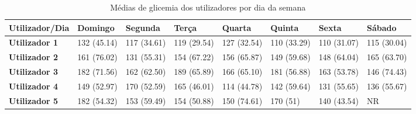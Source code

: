\begin{table}[H]
\centering
\begin{adjustbox}{max width=\textwidth}


\begin{tabular}{|l|l|l|l|l|l|l|l|}
\hline
\rowcolor[HTML]{C0C0C0} 
{\color[HTML]{000000} \textbf{Utilizador/Dia}} & {\color[HTML]{000000} \textbf{Domingo}} & {\color[HTML]{000000} \textbf{Segunda}} & {\color[HTML]{000000} \textbf{Terça}} & {\color[HTML]{000000} \textbf{Quarta}} & {\color[HTML]{000000} \textbf{Quinta}} & {\color[HTML]{000000} \textbf{Sexta}} & {\color[HTML]{000000} \textbf{Sábado}} \\ \hline
\rowcolor[HTML]{FFFFFF} 
\cellcolor[HTML]{C0C0C0}\textbf{Utilizador 1}  & 132 (45.14)                                  & 117 (34.61)                                     & 119 (29.54)                                   & 127 (32.54)                                    & 110 (33.29)                                    & 110 (31.07)                                   & 115 (30.04)                                    \\ \hline
\rowcolor[HTML]{FFFFFF} 
\cellcolor[HTML]{C0C0C0}\textbf{Utilizador 2}  & 161 (76.02)                                     & 131 (55.31)                                     & 154 (67.22)                                   & 156 (65.87)                                    & 149 (59.68)                                    & 148 (64.04)                                   & 165 (63.70)                                    \\ \hline
\rowcolor[HTML]{FFFFFF} 
\cellcolor[HTML]{C0C0C0}\textbf{Utilizador 3}  & 182 (71.56)                                     & 162 (62.50)                                      & 189 (65.89)                                   & 166 (65.10)                                    & 181 (56.88)                                     & 163 (53.78)                                   & 146 (74.43)                                    \\ \hline
\rowcolor[HTML]{FFFFFF} 
\cellcolor[HTML]{C0C0C0}\textbf{Utilizador 4}  & 149 (52.97)                                     & 170 (52.59)                                     & 165 (46.01)                                   & 114 (44.78)                                    & 142 (59.64)                                    & 131 (55.65)                                   & 136 (55.67)                                    \\ \hline
\rowcolor[HTML]{FFFFFF} 
\cellcolor[HTML]{C0C0C0}\textbf{Utilizador 5}  & 182 (54.32)                                     & 153 (59.49)                                     & 154 (50.88)                                   & 150 (74.61)                                    & 170 (51)                                    & 140 (43.54)                                   & NR                                     \\ \hline
\end{tabular}
\end{adjustbox}

\caption{Médias de glicemia dos utilizadores por dia da semana}
\label{tab:dias}
\end{table}
